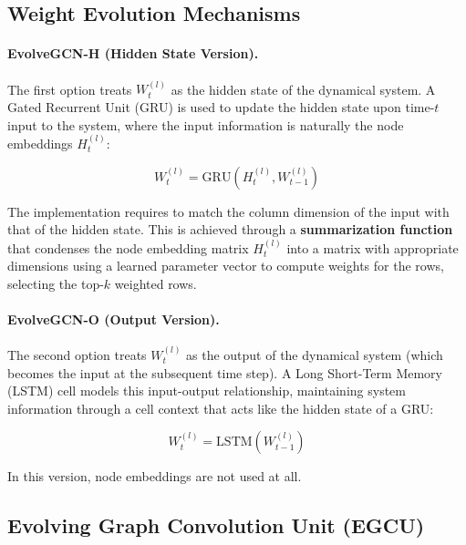 \subsection*{Weight Evolution Mechanisms}


\paragraph{EvolveGCN-H (Hidden State Version).} The first option treats $W_t^{(l)}$ as the hidden state of the dynamical system. A Gated Recurrent Unit (GRU) is used to update the hidden state upon time-$t$ input to the system, where the input information is naturally the node embeddings $H_t^{(l)}$:

\begin{equation}
	W_t^{(l)} = \text{GRU}(H_t^{(l)}, W_{t-1}^{(l)})
\end{equation}

The implementation requires to match the column dimension of the input with that of the hidden state. This is achieved through a \textbf{summarization function} that condenses the node embedding matrix $H_t^{(l)}$ into a matrix with appropriate dimensions using a learned parameter vector to compute weights for the rows, selecting the top-$k$ weighted rows.

\paragraph{EvolveGCN-O (Output Version).} The second option treats $W_t^{(l)}$ as the output of the dynamical system (which becomes the input at the subsequent time step). A Long Short-Term Memory (LSTM) cell models this input-output relationship, maintaining system information through a cell context that acts like the hidden state of a GRU:

\begin{equation}
	W_t^{(l)} = \text{LSTM}(W_{t-1}^{(l)})
\end{equation}

In this version, node embeddings are not used at all.

\subsection*{Evolving Graph Convolution Unit (EGCU)}

